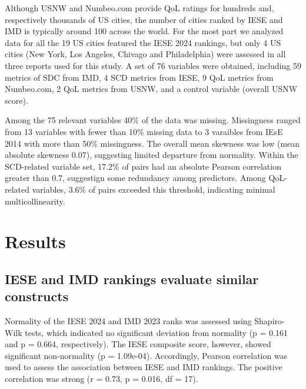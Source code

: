\documentclass[
  english,
  12pt,
  a4paper,
]{scrartcl}
\begin{document}
Although USNW and Numbeo.com provide QoL ratings for hundreds and,
respectively thousands of US cities, the number of cities ranked by IESE
and IMD is typically around 100 across the world. For the most part we
analyzed data for all the 19 US cities featured the IESE 2024 rankings,
but only 4 US cities (New York, Los Angeles, Chivago and Philadelphia)
were assessed in all three reports used for this study. A set of 76
variables were obtained, including 59 metrics of SDC from IMD, 4 SCD
metrics from IESE, 9 QoL metrics from Numbeo.com, 2 QoL metrics from
USNW, and a control variable (overall USNW score).

Among the 75 relevant variables 40\% of the data was missing.
Missingness ranged from 13 variables with fewer than 10\% missing data
to 3 varaibles from IEsE 2014 with more than 50\% missingness. The
overall mean skewness was low (mean absolute skewness 0.07), suggesting
limited departure from normality. Within the SCD-related variable set,
17.2\% of pairs had an absolute Pearson correlation greater than 0.7,
suggestign some redundancy among predictors. Among QoL-related
variables, 3.6\% of pairs exceeded this threshold, indicating minimal
multicollinearity.

\section{Results}\label{results}

\subsection{IESE and IMD rankings evaluate similar
constructs}\label{iese-and-imd-rankings-evaluate-similar-constructs}

Normality of the IESE 2024 and IMD 2023 ranks was assessed using
Shapiro-Wilk tests, which indicated no significant deviation from
normality (p = 0.161 and p = 0.664, respectively). The IESE composite
score, however, showed significant non-normality (p = 1.09e-04).
Accordingly, Pearson correlation was used to assess the association
between IESE and IMD rankings. The positive correlation was strong (r =
0.73, p = 0.016, df = 17).
\end{document}
